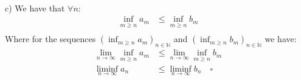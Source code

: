 \documentclass{article}
\begin{document}
\\
c)
We have that $\forall n$:
\begin{equation*}
    \begin{aligned}
        \inf_{m \ge n} a_m &\le \inf_{m \ge n} b_m\\
    \end{aligned}
\end{equation*}
Where for the sequences $(\inf_{m \ge n} a_m)_{n\in\mathbb{N}}$ and $(\inf_{m \ge n} b_m)_{n\in\mathbb{N}}$ we have:
\begin{equation*}
    \begin{aligned}
        \lim_{n\to\infty}\inf_{m \ge n} a_m &\le \lim_{n\to\infty}\inf_{m \ge n} b_m\\
        \liminf_{n\to\infty} a_n &\le \liminf_{n\to\infty} b_n \quad \square
    \end{aligned}
\end{equation*}
\end{document}
